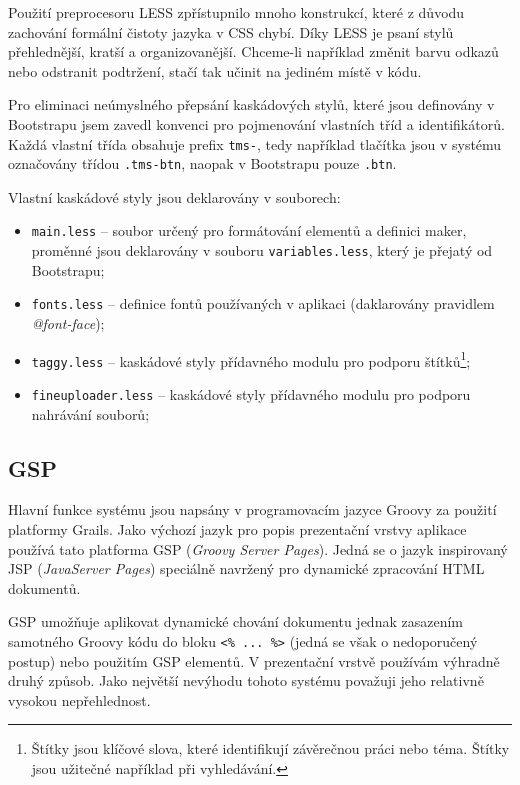 Použití preprocesoru LESS zpřístupnilo mnoho konstrukcí, které z důvodu zachování formální čistoty jazyka v CSS chybí. Díky LESS je psaní stylů přehlednější, kratší a organizovanější. Chceme-li například změnit barvu odkazů nebo odstranit podtržení, stačí tak učinit na jediném místě v kódu.

Pro eliminaci neúmyslného přepsání kaskádových stylů, které jsou definovány v Bootstrapu jsem zavedl konvenci pro pojmenování vlastních tříd a identifikátorů. Každá vlastní třída obsahuje prefix \texttt{tms-}, tedy například tlačítka jsou v systému označovány třídou \texttt{.tms-btn}, naopak v Bootstrapu pouze \texttt{.btn}.

Vlastní kaskádové styly jsou deklarovány v souborech:

\begin{itemize}
    \item \texttt{main.less} -- soubor určený pro formátování elementů a definici maker, proměnné jsou deklarovány v souboru \texttt{variables.less}, který je přejatý od Bootstrapu;
    \item \texttt{fonts.less} -- definice fontů používaných v aplikaci (daklarovány pravidlem \textit{@font-face});
    \item \texttt{taggy.less} -- kaskádové styly přídavného modulu pro podporu štítků\footnote{Štítky jsou klíčové slova, které identifikují závěrečnou práci nebo téma. Štítky jsou užitečné například při vyhledávání.};
    \item \texttt{fineuploader.less} -- kaskádové styly přídavného modulu pro podporu nahrávání souborů;
\end{itemize}

\subsection{GSP}
\label{subsec:gsp}

Hlavní funkce systému jsou napsány v programovacím jazyce Groovy za použití platformy Grails. Jako výchozí jazyk pro popis prezentační vrstvy aplikace používá tato platforma GSP (\textit{Groovy Server Pages}). Jedná se o jazyk inspirovaný JSP (\textit{JavaServer Pages}) speciálně navržený pro dynamické zpracování HTML dokumentů.

GSP umožňuje aplikovat dynamické chování dokumentu jednak zasazením samotného Groovy kódu do bloku \texttt{<\% ... \%>} (jedná se však o nedoporučený postup) nebo použitím GSP elementů. V prezentační vrstvě používám výhradně druhý způsob. Jako největší nevýhodu tohoto systému považuji jeho relativně vysokou nepřehlednost.


